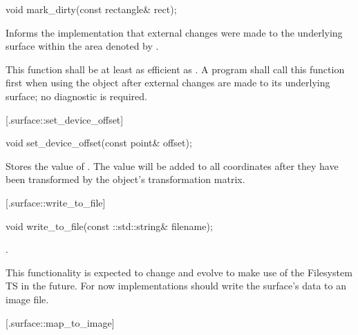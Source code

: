 \begin{itemdecl}
void mark_dirty(const rectangle& rect);
\end{itemdecl}
\begin{itemdescr}
	\pnum
	\effects
	Informs the implementation that external changes were made to the underlying surface within the area denoted by .
	
	\pnum
	\remarks
	This function shall be at least as efficient as . A program shall call this function first when using the  object after external changes are made to its underlying surface; no diagnostic is required.
\end{itemdescr}

 [\iotwod.surface::set_device_offset] {}

%
%
\begin{itemdecl}
void set_device_offset(const point& offset);
\end{itemdecl}
\begin{itemdescr}
	\pnum
	\effects
	Stores the value of . The value will be added to all coordinates after they have been transformed by the  object's transformation matrix.
\end{itemdescr}

 [\iotwod.surface::write_to_file] {}

%
%
\begin{itemdecl}
void write_to_file(const ::std::string& filename);
\end{itemdecl}
\begin{itemdescr}
	\pnum
	\effects
	.
	
	\pnum
	\realnotes
	This functionality is expected to change and evolve to make use of the Filesystem TS in the future. For now implementations should write the surface's data to an image file.
\end{itemdescr}

 [\iotwod.surface::map_to_image] {}

